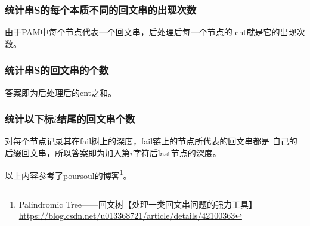 \subsubsection{统计串S的每个本质不同的回文串的出现次数}
由于PAM中每个节点代表一个回文串，后处理后每一个节点的
cnt就是它的出现次数。
\subsubsection{统计串S的回文串的个数}
答案即为后处理后的cnt之和。
\subsubsection{统计以下标$i$结尾的回文串个数}
对每个节点记录其在fail树上的深度，fail链上的节点所代表的回文串都是
自己的后缀回文串，所以答案即为加入第$i$字符后last节点的深度。


以上内容参考了poursoul的博客\footnote{
    Palindromic Tree——回文树【处理一类回文串问题的强力工具】
    \url{https://blog.csdn.net/u013368721/article/details/42100363}
}。
